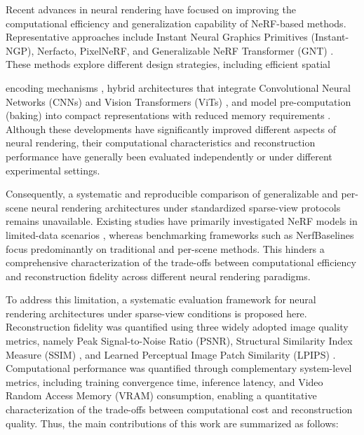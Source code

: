 Recent advances in neural rendering have focused on improving the computational efficiency and generalization capability of NeRF-based methods. Representative approaches include Instant Neural Graphics Primitives (Instant-NGP), Nerfacto, PixelNeRF, and Generalizable NeRF Transformer (GNT) \cite{muller2022, Tancik2023, yu2021pixelnerfneuralradiancefields, t2023attentionnerfneeds}. These methods explore different design strategies, including efficient spatial {encoding mechanisms \cite{muller2022}, hybrid architectures that integrate Convolutional Neural Networks (CNNs) and Vision Transformers (ViTs) \cite{schwarz2021grafgenerativeradiancefields, wu2021cvt, t2023attentionnerfneeds}, and model pre-computation (baking) into compact representations with reduced memory requirements \cite{hedman2021bakingneuralradiancefields}. Although these developments have significantly improved different aspects of neural rendering, their computational characteristics and reconstruction performance have generally been evaluated independently or under different experimental settings.

Consequently, a systematic and reproducible comparison of generalizable and per-scene neural rendering architectures under standardized sparse-view protocols remains unavailable. Existing studies have primarily investigated NeRF models in limited-data scenarios \cite{niemeyer2022regnerf, kim2023poserefinement}, whereas benchmarking frameworks such as NerfBaselines \cite{kulhanek2025nerfbaselinesconsistentreproducibleevaluation} focus predominantly on traditional and per-scene methods. This hinders a comprehensive characterization of the trade-offs between computational efficiency and reconstruction fidelity across different neural rendering paradigms.

To address this limitation, a systematic evaluation framework for neural rendering architectures under sparse-view conditions is proposed here. Reconstruction fidelity was quantified using three widely adopted image quality metrics, namely Peak Signal-to-Noise Ratio (PSNR), Structural Similarity Index Measure (SSIM) \cite{wang2004image}, and Learned Perceptual Image Patch Similarity (LPIPS) \cite{zhang2018unreasonable}. Computational performance was quantified through complementary system-level metrics, including training convergence time, inference latency, and Video Random Access Memory (VRAM) consumption, enabling a quantitative characterization of the trade-offs between computational cost and reconstruction quality. Thus, the main contributions of this work are summarized as follows:
\begin{itemize} 


\end{itemize}}
